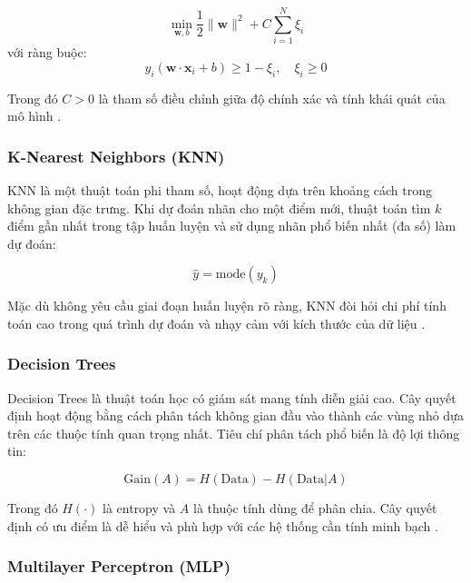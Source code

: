 \[
\min_{\mathbf{w}, b} \frac{1}{2} \|\mathbf{w}\|^2 + C \sum_{i=1}^N \xi_i
\]
với ràng buộc:
\[
y_i (\mathbf{w} \cdot \mathbf{x}_i + b) \geq 1 - \xi_i, \quad \xi_i \geq 0
\]

Trong đó \(C > 0\) là tham số điều chỉnh giữa độ chính xác và tính khái quát của mô hình \cite{cortes1995support}.

\subsubsection*{K-Nearest Neighbors (KNN)}

KNN là một thuật toán phi tham số, hoạt động dựa trên khoảng cách trong không gian đặc trưng. Khi dự đoán nhãn cho một điểm mới, thuật toán tìm \(k\) điểm gần nhất trong tập huấn luyện và sử dụng nhãn phổ biến nhất (đa số) làm dự đoán:

\[
\hat{y} = \text{mode}(y_{k})
\]

Mặc dù không yêu cầu giai đoạn huấn luyện rõ ràng, KNN đòi hỏi chi phí tính toán cao trong quá trình dự đoán và nhạy cảm với kích thước của dữ liệu \cite{cover1967nearest}.

\subsubsection*{Decision Trees}

Decision Trees là thuật toán học có giám sát mang tính diễn giải cao. Cây quyết định hoạt động bằng cách phân tách không gian đầu vào thành các vùng nhỏ dựa trên các thuộc tính quan trọng nhất. Tiêu chí phân tách phổ biến là độ lợi thông tin:

\[
\text{Gain}(A) = H(\text{Data}) - H(\text{Data} | A)
\]

Trong đó \(H(\cdot)\) là entropy và \(A\) là thuộc tính dùng để phân chia. Cây quyết định có ưu điểm là dễ hiểu và phù hợp với các hệ thống cần tính minh bạch \cite{quinlan1986induction}.

\subsubsection*{Multilayer Perceptron (MLP)}

